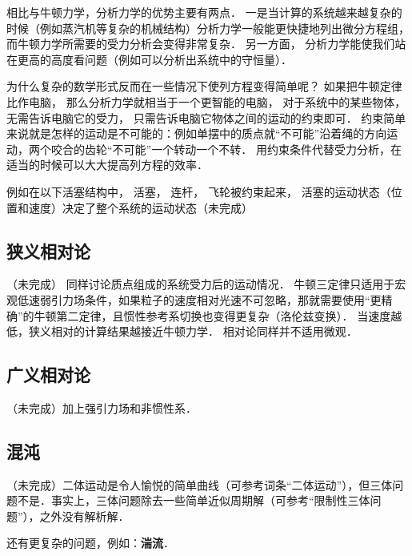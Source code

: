 相比与牛顿力学，分析力学的优势主要有两点． 一是当计算的系统越来越复杂的时候（例如蒸汽机等复杂的机械结构）分析力学一般能更快捷地列出微分方程组， 而牛顿力学所需要的受力分析会变得非常复杂． 另一方面， 分析力学能使我们站在更高的高度看问题（例如可以分析出系统中的守恒量）．

为什么复杂的数学形式反而在一些情况下使列方程变得简单呢？ 如果把牛顿定律比作电脑， 那么分析力学就相当于一个更智能的电脑， 对于系统中的某些物体， 无需告诉电脑它的受力， 只需告诉电脑它物体之间的运动的约束即可． 约束简单来说就是怎样的运动是不可能的：例如单摆中的质点就“不可能”沿着绳的方向运动，两个咬合的齿轮“不可能”一个转动一个不转． 用约束条件代替受力分析，在适当的时候可以大大提高列方程的效率．

例如在以下活塞结构中， 活塞， 连杆， 飞轮被约束起来， 活塞的运动状态（位置和速度）决定了整个系统的运动状态（未完成）%

\subsection{狭义相对论}
（未完成）
同样讨论质点组成的系统受力后的运动情况． 牛顿三定律只适用于宏观低速弱引力场条件，如果粒子的速度相对光速不可忽略，那就需要使用“更精确”的牛顿第二定律，且惯性参考系切换也变得更复杂（洛伦兹变换）． 当速度越低，狭义相对的计算结果越接近牛顿力学． 相对论同样并不适用微观．

\subsection{广义相对论}
（未完成）加上强引力场和非惯性系．
\subsection{混沌}
（未完成）二体运动是令人愉悦的简单曲线（可参考词条“二体运动”），但三体问题不是．事实上，三体问题除去一些简单近似周期解（可参考“限制性三体问题”），之外没有解析解．

还有更复杂的问题，例如：\textbf{湍流}．